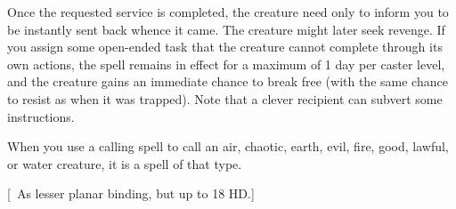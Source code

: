 {Once the requested service is completed, the creature need only to inform you to be instantly sent back whence it came. The creature might later seek revenge. If you assign some open-ended task that the creature cannot complete through its own actions, the spell remains in effect for a maximum of 1 day per caster level, and the creature gains an immediate chance to break free (with the same chance to resist as when it was trapped). Note that a clever recipient can subvert some instructions.

When you use a calling spell to call an air, chaotic, earth, evil, fire, good, lawful, or water creature, it is a spell of that type.}
        
[ As lesser planar binding, but up to 18 HD.]
